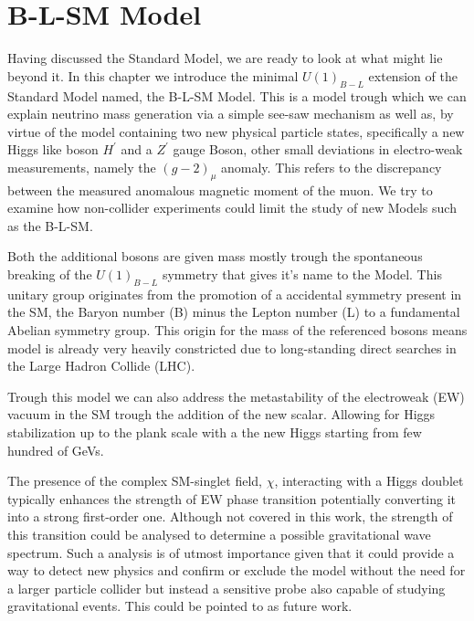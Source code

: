 
\newpage 

% 
% 
% 

\section{B-L-SM Model}


Having discussed the Standard Model, we are ready to look at what might lie beyond it. In this chapter we introduce the minimal $U(1)_{B-L}$ extension of the Standard Model named, the B-L-SM Model. This is a model trough which we can explain neutrino mass generation via a simple see-saw mechanism as well as, by virtue of the model containing two new physical particle states, specifically a new Higgs like boson $H^\prime$ and a $Z^\prime$ gauge Boson, other small deviations in electro-weak measurements, namely the $(g-2)_\mu$ anomaly. This refers to the discrepancy between the measured anomalous magnetic moment of the muon. We try to examine how non-collider experiments could limit the study of new Models such as the B-L-SM.  

Both the additional bosons are given mass mostly trough the spontaneous breaking of the $U(1)_{B-L}$ symmetry that gives it's name to the Model. This unitary group originates from the promotion of a accidental symmetry present in the SM, the Baryon number (B) minus the Lepton number (L) to a fundamental Abelian symmetry group. This origin for the mass of the referenced bosons means model is already very heavily constricted due to long-standing direct searches in the Large Hadron Collide (LHC). 

Trough this model we can also address the metastability of the electroweak (EW) vacuum in the SM trough the addition of the new scalar. Allowing for Higgs stabilization up to the plank scale with a the new Higgs starting from few hundred of GeVs. 

The presence of the complex SM-singlet field, $\chi$, interacting with a Higgs doublet typically enhances the strength of EW phase transition potentially converting it into a strong first-order one.
%
Although not covered in this work, the strength of this transition could be analysed to determine a possible gravitational wave spectrum. Such a analysis is of utmost importance given that it could provide a way to detect new physics and confirm or exclude the model without the need for a larger particle collider but instead a sensitive probe also capable of studying gravitational events. This could be pointed to as future work.


